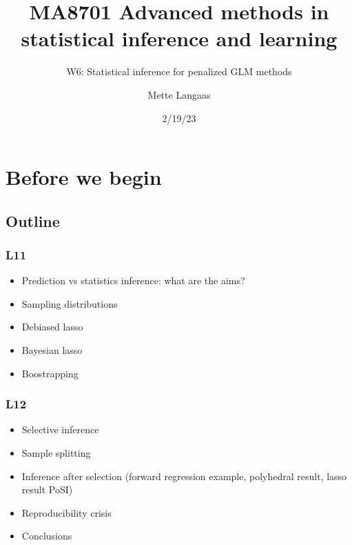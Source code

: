 \documentclass[
  letterpaper,
  DIV=11,
  numbers=noendperiod]{scrartcl}
\title{MA8701 Advanced methods in statistical inference and learning}
\subtitle{W6: Statistical inference for penalized GLM methods}
\author{Mette Langaas}
\date{2/19/23}
\providecommand{\tightlist}{%
  \setlength{\itemsep}{0pt}\setlength{\parskip}{0pt}}\usepackage{longtable,booktabs,array}
\renewcommand*\contentsname{Table of contents}
\newcommand\contentsname{Table of contents}
\begin{document}
\maketitle
\ifdefined\Shaded\renewenvironment{Shaded}{\begin{tcolorbox}[boxrule=0pt, breakable, borderline west={3pt}{0pt}{shadecolor}, enhanced, interior hidden, sharp corners, frame hidden]}{\end{tcolorbox}}\fi

\renewcommand*\contentsname{Table of contents}
{
\hypersetup{linkcolor=}
\setcounter{tocdepth}{3}
\tableofcontents
}
\hypertarget{before-we-begin}{%
\section{Before we begin}\label{before-we-begin}}

\hypertarget{outline}{%
\subsection{Outline}\label{outline}}

\hypertarget{l11}{%
\subsubsection{L11}\label{l11}}

\begin{itemize}
\tightlist
\item
  Prediction vs statistics inference: what are the aims?
\item
  Sampling distributions
\item
  Debiased lasso
\item
  Bayesian lasso
\item
  Boostrapping
\end{itemize}

\hypertarget{l12}{%
\subsubsection{L12}\label{l12}}

\begin{itemize}
\tightlist
\item
  Selective inference
\item
  Sample splitting
\item
  Inference after selection (forward regression example, polyhedral
  result, lasso result PoSI)
\item
  Reproducibility crisis
\item
  Conclusions
\end{itemize}
\end{document}
